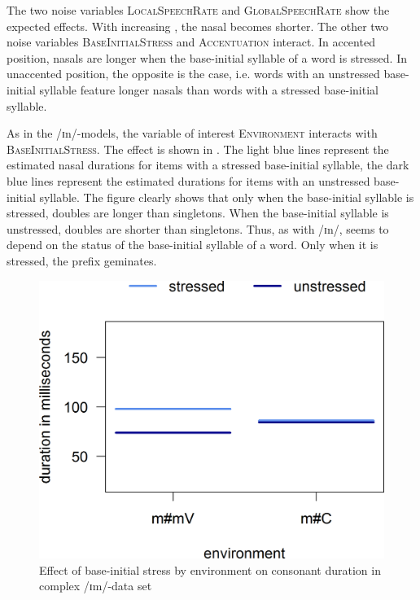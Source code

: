 The two noise variables \textsc{LocalSpeechRate} and \textsc{GlobalSpeechRate} show the expected effects. With increasing , the nasal becomes shorter.
 The other two noise variables \textsc{BaseInitialStress} and \textsc{Accentuation} interact. In accented position, nasals are longer when the base-initial syllable of a word is stressed. In unaccented position, the opposite is the case, i.e. words with an unstressed base-initial syllable feature longer nasals than words with a stressed base-initial syllable. 
 


As in the /ɪn/-models, the variable of interest \textsc{Environment} interacts with \textsc{BaseInitialStress}. The effect is shown in . 
The light blue lines represent the estimated nasal durations for items with a stressed base-initial syllable, the dark blue lines represent  the estimated durations for items with an unstressed base-initial syllable.
The figure clearly shows that 
 only when the base-initial syllable is stressed, doubles are  longer than singletons. When the base-initial syllable is unstressed, doubles are shorter than singletons. 
Thus, as with /ɪn/,  seems to depend on the  status of the base-initial syllable of a word. Only when it is stressed, the prefix  geminates.

 \begin{figure}
 	
 	\includegraphics [scale=0.5] {images/Experiment/imModelInterEnvStress}
 	\caption{Effect of base-initial stress by environment on consonant duration in complex /ɪm/-data set}
 	\label{fig:NumNasal imComplex experiment}
 	
 \end{figure}



